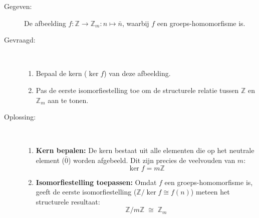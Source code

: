 \begin{description}
    \item[Gegeven:] De afbeelding $f: \mathbb{Z} \to \mathbb{Z}_m : n \mapsto \bar{n}$, waarbij $f$ een groeps-homomorfisme is.
    \item[Gevraagd:] \
    \begin{enumerate}
        \item Bepaal de kern ($\ker f$) van deze afbeelding.
        \item Pas de eerste isomorfiestelling toe om de structurele relatie tussen $\mathbb{Z}$ en $\mathbb{Z}_m$ aan te tonen.
    \end{enumerate}
    \item[Oplossing:] \
    \begin{enumerate}
        \item \textbf{Kern bepalen:} De kern bestaat uit alle elementen die op het neutrale element ($\bar{0}$) worden afgebeeld. Dit zijn precies de veelvouden van $m$:
        $$ \ker f = m\mathbb{Z} $$
        \item \textbf{Isomorfiestelling toepassen:} Omdat $f$ een groeps-homomorfisme is, geeft de eerste isomorfiestelling ($\mathbb{Z}/\ker f \cong f(n)$) meteen het structurele resultaat:
        $$ \mathbb{Z}/m\mathbb{Z} \;\cong\; \mathbb{Z}_m $$
    \end{enumerate}
\end{description}

